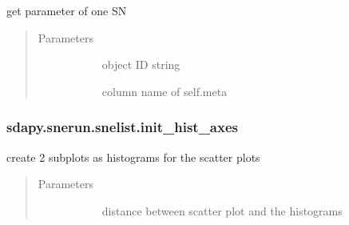 \documentclass[letterpaper,10pt,english]{sphinxmanual}
\begin{document}
\begin{fulllineitems}
\begin{fulllineitems}
\label{\detokenize{generated/sdapy.snerun.snelist.get_par:sdapy.snerun.snelist.get_par}}
get parameter of one SN
\begin{quote}\begin{description}
\item[{Parameters}] \leavevmode\begin{description}
\item[{}] \leavevmode{[}\sphinxtitleref{str}{]}
object ID string

\item[{}] \leavevmode{[}\sphinxtitleref{str}{]}
column name of self.meta

\end{description}

\end{description}\end{quote}

\end{fulllineitems}



\subsubsection{sdapy.snerun.snelist.init\_hist\_axes}
\label{\detokenize{generated/sdapy.snerun.snelist.init_hist_axes:sdapy-snerun-snelist-init-hist-axes}}\label{\detokenize{generated/sdapy.snerun.snelist.init_hist_axes::doc}}

\begin{fulllineitems}
\label{\detokenize{generated/sdapy.snerun.snelist.init_hist_axes:sdapy.snerun.snelist.init_hist_axes}}
create 2 subplots as histograms for the scatter plots
\begin{quote}\begin{description}
\item[{Parameters}] \leavevmode\begin{description}
\item[{}] \leavevmode{[}\sphinxtitleref{float}{]}
distance between scatter plot and the histograms


\end{description}
\end{description}
\end{quote}
\end{fulllineitems}
\end{fulllineitems}
\end{document}
